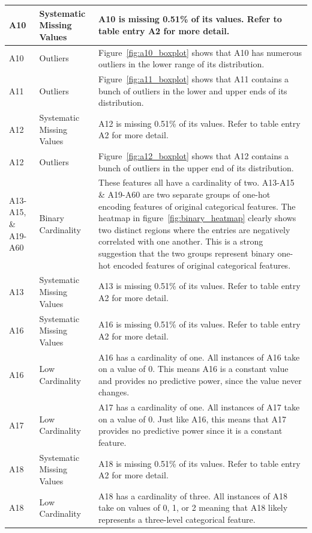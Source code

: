 \documentclass[11pt]{report}
\begin{document}
\begin{longtable}{lp{4cm}p{7cm}}
\midrule
A10 & Systematic Missing Values & A10 is missing 0.51\% of its values.  Refer to table entry A2 for more detail. \\
\midrule
A10 & Outliers & Figure~\ref{fig:a10_boxplot} shows that A10 has numerous outliers in the lower range of its distribution. \\
\midrule
A11 & Outliers & Figure~\ref{fig:a11_boxplot} shows that A11 contains a bunch of outliers in the lower and upper ends of its distribution. \\
\midrule
A12 & Systematic Missing Values & A12 is missing 0.51\% of its values.  Refer to table entry A2 for more detail. \\
\midrule
A12 & Outliers & Figure~\ref{fig:a12_boxplot} shows that A12 contains a bunch of outliers in the upper end of its distribution. \\
\midrule
A13-A15, \& A19-A60 & Binary Cardinality & These features all have a cardinality of two. A13-A15 \& A19-A60 are two separate groups of one-hot encoding features of original categorical features. The heatmap in figure~\ref{fig:binary_heatmap} clearly shows two distinct regions where the entries are negatively correlated with one another. This is a strong suggestion that the two groups represent binary one-hot encoded features of original categorical features. \\
\midrule
A13 & Systematic Missing Values & A13 is missing 0.51\% of its values.  Refer to table entry A2 for more detail. \\
\midrule
A16 & Systematic Missing Values & A16 is missing 0.51\% of its values.  Refer to table entry A2 for more detail. \\
\midrule
A16 & Low Cardinality & A16 has a cardinality of one. All instances of A16 take on a value of 0. This means A16 is a constant value and provides no predictive power, since the value never changes. \\
\midrule
A17 & Low Cardinality & A17 has a cardinality of one. All instances of A17 take on a value of 0. Just like A16, this means that A17 provides no predictive power since it is a constant feature. \\ 
\midrule
A18 & Systematic Missing Values & A18 is missing 0.51\% of its values.  Refer to table entry A2 for more detail. \\
\midrule
A18 & Low Cardinality & A18 has a cardinality of three. All instances of A18 take on values of 0, 1, or 2 meaning that A18 likely represents a three-level categorical feature. \\

\end{longtable}
\end{document}
